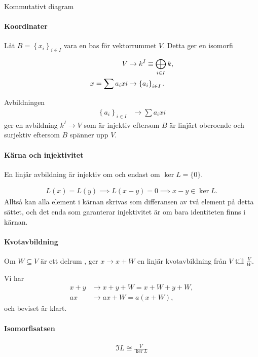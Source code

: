 \proof
Kommutativt diagram

\paragraph{Koordinater}
Låt $B = \left\{x_{i}\right\}_{i\in I}$ vara en bas för vektorrummet $V$. Detta ger en isomorfi
\begin{align*}
	V                  &\to k^{I}\equiv \bigoplus\limits_{i\in I}^{}k, \\
	x = \sum a_{i}x{i} &\to \left\{a_{i}\right\}_{i\in I}.
\end{align*}

\proof
Avbildningen
\begin{align*}
	\left\{a_{i}\right\}_{i\in I} &\to \sum a_{i}x{i}
\end{align*}
ger en avbildning $k^{I}\to V$ som är injektiv eftersom $B$ är linjärt oberoende och surjektiv eftersom $B$ spänner upp $V$.

\paragraph{Kärna och injektivitet}
En linjär avbildning är injektiv om och endast om $\ker{L} = \{0\}$.

\proof
\begin{align*}
	L(x) = L(y)\implies L(x - y) = 0\implies x - y\in\ker{L}.
\end{align*}
Alltså kan alla element i kärnan skrivas som differansen av två element på detta sättet, och det enda som garanterar injektivitet är om bara identiteten finns i kärnan.

\paragraph{Kvotavbildning}
Om $W\subseteq V$ är ett delrum , ger $x\to x + W$ en linjär kvotavbildning från $V$ till $\frac{V}{W}$.

\proof
Vi har
\begin{align*}
	x + y &\to x + y + W = x + W + y + W, \\
	ax    &\to ax + W = a(x + W),
\end{align*}
och beviset är klart.

\paragraph{Isomorfisatsen}
\begin{align*}
	\Im{L} \cong \frac{V}{\ker{L}}
\end{align*}

